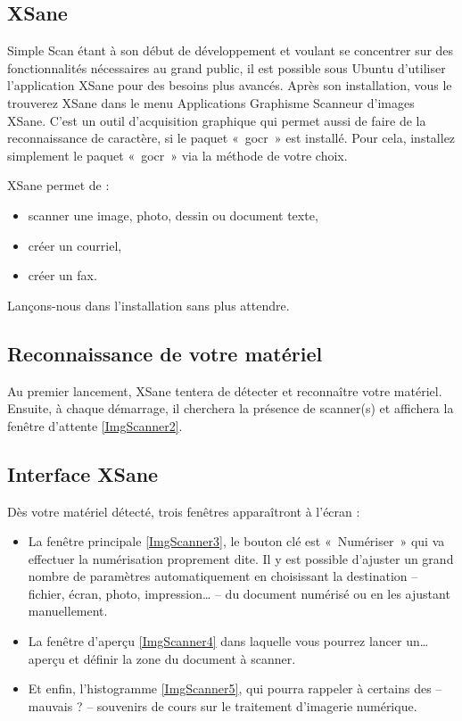\subsection{XSane}
Simple Scan étant à son début de développement et voulant se concentrer sur des fonctionnalités nécessaires au grand public, il est possible sous Ubuntu d'utiliser l'application XSane pour des besoins plus avancés. Après son installation, vous le trouverez XSane dans le menu  Applications \FlecheDroite Graphisme \FlecheDroite Scanneur d'images XSane. C'est un outil d'acquisition graphique qui permet aussi de faire de la reconnaissance de caractère, si le paquet «~gocr~» est installé. Pour cela, installez simplement le paquet «~gocr~» via la méthode de votre choix.\par
XSane permet de :
\begin{itemize}
\item scanner une image, photo, dessin ou document texte, 
\item créer un courriel, 
\item créer un fax. 
\end{itemize}
Lançons-nous dans l'installation sans plus attendre.
\subsection{Reconnaissance de votre matériel}
Au premier lancement, XSane tentera de détecter et reconnaître votre matériel. Ensuite, à chaque démarrage, il cherchera la présence de scanner(s) et affichera la fenêtre d'attente \ref{ImgScanner2}.
\subsection{Interface XSane}
Dès votre matériel détecté, trois fenêtres apparaîtront à l'écran : 
\ScannerPresentation
\begin{itemize}
\item La fenêtre principale \ref{ImgScanner3}, le bouton clé est «~Numériser~» qui va effectuer la numérisation proprement dite. Il y est possible d'ajuster un grand nombre de paramètres automatiquement en choisissant la destination -- fichier, écran, photo, impression\ldots{} -- du document numérisé ou en les ajustant manuellement.
\item La fenêtre d'aperçu \ref{ImgScanner4} dans laquelle vous pourrez lancer un\ldots{} aperçu et définir la zone du document à scanner.
\item Et enfin, l'histogramme \ref{ImgScanner5}, qui pourra rappeler à certains des -- mauvais ? -- souvenirs de cours sur le traitement d'imagerie numérique.
\end{itemize}
